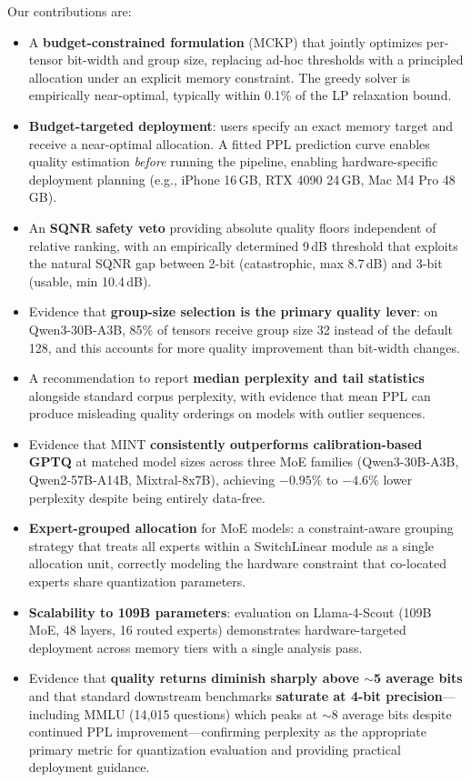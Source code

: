 \documentclass{article}
\begin{document}
Our contributions are:
\begin{itemize}
    \item A \textbf{budget-constrained formulation} (MCKP) that jointly optimizes per-tensor bit-width and group size, replacing ad-hoc thresholds with a principled allocation under an explicit memory constraint. The greedy solver is empirically near-optimal, typically within 0.1\% of the LP relaxation bound.
    \item \textbf{Budget-targeted deployment}: users specify an exact memory target and receive a near-optimal allocation. A fitted PPL prediction curve enables quality estimation \emph{before} running the pipeline, enabling hardware-specific deployment planning (e.g., iPhone 16\,GB, RTX 4090 24\,GB, Mac M4 Pro 48\,GB).
    \item An \textbf{SQNR safety veto} providing absolute quality floors independent of relative ranking, with an empirically determined 9\,dB threshold that exploits the natural SQNR gap between 2-bit (catastrophic, max 8.7\,dB) and 3-bit (usable, min 10.4\,dB).
    \item Evidence that \textbf{group-size selection is the primary quality lever}: on Qwen3-30B-A3B, 85\% of tensors receive group size 32 instead of the default 128, and this accounts for more quality improvement than bit-width changes.
    \item A recommendation to report \textbf{median perplexity and tail statistics} alongside standard corpus perplexity, with evidence that mean PPL can produce misleading quality orderings on models with outlier sequences.
    \item Evidence that MINT \textbf{consistently outperforms calibration-based GPTQ} at matched model sizes across three MoE families (Qwen3-30B-A3B, Qwen2-57B-A14B, Mixtral-8x7B), achieving $-0.95\%$ to $-4.6\%$ lower perplexity despite being entirely data-free.
    \item \textbf{Expert-grouped allocation} for MoE models: a constraint-aware grouping strategy that treats all experts within a SwitchLinear module as a single allocation unit, correctly modeling the hardware constraint that co-located experts share quantization parameters.
    \item \textbf{Scalability to 109B parameters}: evaluation on Llama-4-Scout (109B MoE, 48 layers, 16 routed experts) demonstrates hardware-targeted deployment across memory tiers with a single analysis pass.
    \item Evidence that \textbf{quality returns diminish sharply above ${\sim}$5 average bits} and that standard downstream benchmarks \textbf{saturate at 4-bit precision}---including MMLU (14{,}015 questions) which peaks at ${\sim}$8 average bits despite continued PPL improvement---confirming perplexity as the appropriate primary metric for quantization evaluation and providing practical deployment guidance.
\end{itemize}
\end{document}
